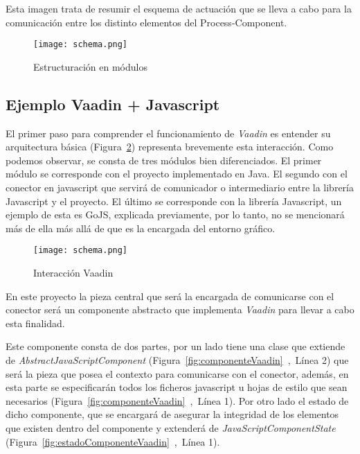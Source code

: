 Esta imagen trata de  resumir el esquema de actuación que se lleva a cabo para la comunicación entre los distinto elementos del Process-Component.

\begin{figure}[H]
	\centering
	\texttt{[image: schema.png]}
	\caption{Estructuración en módulos}\label{fig:schema}
\end{figure}

\subsection{Ejemplo Vaadin + Javascript}

El primer paso para comprender el funcionamiento de \emph{Vaadin} es entender su arquitectura básica (Figura~\ref{fig:schema}) representa brevemente esta interacción. Como podemos observar, se consta de tres módulos bien diferenciados. El primer módulo se corresponde con el proyecto implementado en Java. El segundo con el conector en javascript que servirá de comunicador o intermediario entre la librería Javascript y el proyecto. El último se corresponde con la librería Javascript, un ejemplo de esta es GoJS, explicada previamente, por lo tanto, no se mencionará más de ella más allá de que es la encargada del entorno gráfico.



\begin{figure}[!tb]
	\centering
	\texttt{[image: schema.png]}
	\caption{Interacción Vaadin}\label{fig:schema}
\end{figure}




En este proyecto la pieza central que será la encargada de comunicarse con el conector será un componente abstracto que implementa \emph{Vaadin} para llevar a cabo esta finalidad.

Este componente consta de dos partes, por un lado tiene una clase que extiende de \emph{AbstractJavaScriptComponent} (Figura~\ref{fig:componenteVaadin}~,~Línea 2) que será la pieza que posea el contexto para comunicarse con el conector, además, en esta parte se especificarán todos los ficheros javascript u hojas de estilo que sean necesarios (Figura~\ref{fig:componenteVaadin}~,~Línea 1). Por otro lado el estado de dicho componente, que se encargará de asegurar la integridad de los elementos que existen dentro del componente y extenderá de \emph{JavaScriptComponentState} (Figura~\ref{fig:estadoComponenteVaadin}~,~Línea 1).

